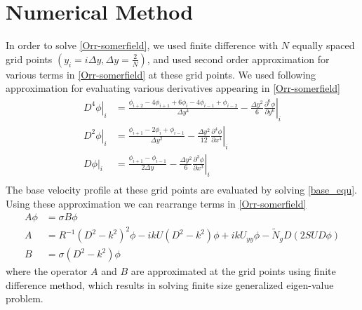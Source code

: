 \documentclass[12pt]{report}   %
\newcommand{\del}{\partial}
\newcommand{\Rey}{{R}}
\newcommand{\Ndg}{\tilde{N}_g}
\begin{document}
\section{Numerical Method}
  In order to solve \eqref{Orr-somerfield}, we used finite difference with $N$ equally spaced grid points $(y_i = i\Delta y, \Delta y = \frac{2}{N})$, and used second order approximation for various terms in \eqref{Orr-somerfield} at these grid points. We used following approximation for evaluating various derivatives appearing in \eqref{Orr-somerfield}
  \begin{equation}
  \begin{align}
    \left.{ D^4\phi} \right|_i &= \frac{ \phi_{i+2}-4\phi_{i+1}+6\phi_{i}-4\phi_{i-1}+\phi_{i-2} }{\Delta y^4} - \frac{\Delta y^2}{6} \left. \frac{\del^6 \phi}{\del y^6} \right |_i \\
    \left. D^2\phi \right|_i &=  \frac{\phi_{i+1} -2\phi_i +\phi_{i-1}}{\Delta y^2} - \left. \frac{\Delta y^2}{12} \frac{\del^4 \phi}{\del x^4} \right|_i \\    
    \left. D\phi \right|_i &=  \frac{\phi_{i+1} -\phi_{i-1}}{2\Delta y} - \left. \frac{\Delta y^2}{6} \frac{\del^3 \phi}{\del x^3} \right|_i \\
    \end{align}
  \end{equation}
  The base velocity profile at these grid points are evaluated by solving \eqref{base_equ}. Using these approximation we can rearrange terms in \eqref{Orr-somerfield} 
\begin{equation}
\begin{split}
A\phi &= \sigma B \phi\\
A &= \Rey^{-1}\left(D^2 -k^{2} \right)^2\phi-ikU \left(D^2-k^2\right)\phi + ik U_{yy}\phi -\Ndg D\left(2 S U D \phi\right)\\
B &= {\sigma} \left(D^2-k^2\right) \phi
\end{split}
\end{equation}
where the operator $A$ and $B$ are approximated at the grid points using finite difference method, which results in solving finite size generalized eigen-value problem.
\end{document}
